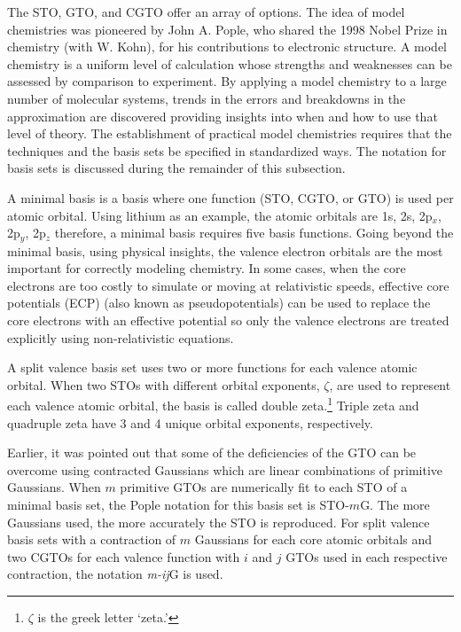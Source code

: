 \documentclass[11pt,oneside,final]{huthesis}%
\begin{document}
The STO, GTO, and CGTO offer an array of options.  The idea of model chemistries was pioneered by John A. Pople, who shared the 1998 Nobel Prize in chemistry (with W. Kohn), for his contributions to electronic structure.   A model chemistry is a uniform level of calculation whose strengths and weaknesses can be assessed by comparison to experiment.  By applying a model chemistry to a large number of molecular systems, trends in the errors and breakdowns in the approximation are discovered providing insights into when and how to use that level of theory. The establishment of practical model chemistries requires that the techniques and the basis sets be specified in standardized ways.  The notation for basis sets is discussed during the remainder of this subsection.

A {minimal basis} is a basis where one function (STO, CGTO, or GTO) is used per atomic orbital. Using lithium as an example, the atomic orbitals are 1s, 2s, 2p$_{x}$, 2p$_{y}$, 2p$_{z}$ therefore, a minimal basis requires five basis functions.  Going beyond the minimal basis, using physical insights, the valence electron orbitals are the most important for correctly modeling chemistry.  In some cases, when the core electrons are too costly to simulate or moving at relativistic speeds, effective core potentials (ECP) (also known as pseudopotentials) can be used to replace the core electrons with an effective potential so only the valence electrons are treated explicitly using non-relativistic equations.  

A split valence basis set uses two or more functions for each valence atomic orbital. When two STOs with different orbital exponents, $\zeta$, are used to represent each valence atomic orbital, the basis is called double zeta.\footnote{$\zeta$ is the greek letter `zeta.'} Triple zeta and quadruple zeta have 3 and 4 unique orbital exponents, respectively.

Earlier, it was pointed out that some of the deficiencies of the GTO can be overcome using contracted Gaussians which are linear combinations of primitive Gaussians.  When $m$ primitive GTOs are numerically fit to each STO of a minimal basis set, the Pople notation for this basis set is STO-$m$G. The more Gaussians used, the more accurately the STO is reproduced.   For split valence basis sets with a contraction of $m$ Gaussians for each core atomic orbitals and two CGTOs for each valence function with $i$ and $j$ GTOs used in each respective contraction,  the notation \textit{m-ij}G is used.  
\end{document}
